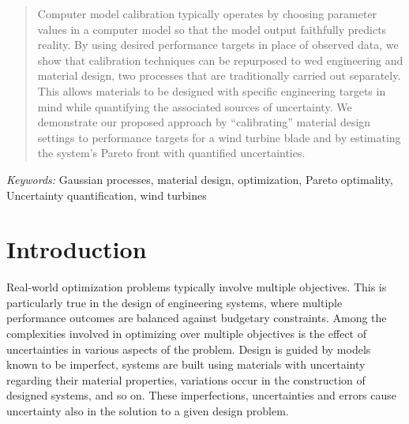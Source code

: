 \documentclass[12pt]{article}
\begin{document}
\bigskip
\begin{abstract}
%
%
Computer model calibration typically operates by choosing parameter values in a computer model so that the model output faithfully predicts reality. 
%
By using desired performance targets in place of observed data, we show that calibration techniques can be repurposed to wed engineering and material design, two processes that are traditionally carried out separately.
% 
This allows materials to be designed with specific engineering targets in mind while quantifying the associated sources of uncertainty. 
%
We demonstrate our proposed approach by ``calibrating'' material design settings to performance targets for a wind turbine blade and by estimating the system's Pareto front with quantified uncertainties.
\end{abstract}

\noindent%
{\it Keywords:}  Gaussian processes, material design, optimization, Pareto optimality, Uncertainty quantification, wind turbines
\vfill

\newpage
{} %
\section{Introduction}
\label{introduction}

Real-world optimization problems typically involve multiple objectives. 
%
This is particularly true in the design of engineering systems, where multiple performance outcomes are balanced against budgetary constraints. 
%
Among the complexities involved in optimizing over multiple objectives is the effect of uncertainties in various aspects of the problem. 
%
Design is guided by models known to be imperfect, systems are built using materials with uncertainty regarding their material properties, variations occur in the construction of designed systems, and so on. 
%
These imperfections, uncertainties and errors cause uncertainty also in the solution to a given design problem. 
\end{document}
